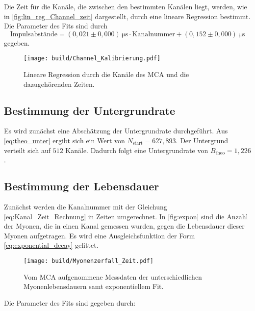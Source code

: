 Die Zeit für die Kanäle, die zwischen den bestimmten Kanälen liegt, werden, wie in \autoref{fig:lin_reg_Channel_zeit} dargestellt, durch eine lineare Regression bestimmt.
Die Parameter des Fits sind durch 
\begin{equation}
    \text{Impulsabstände} = \left(0,021 \pm 0,000 \right) \,\unit{\micro\second} \cdot  \text{Kanalnummer} + \left(0,152 \pm 0,000 \right) \,\unit{\micro\second}
    \label{eq:Kanal_Zeit_Rechnung}
\end{equation}
gegeben.

\begin{figure}[H]
    \centering
    \texttt{[image: build/Channel\_Kalibrierung.pdf]}
    \caption{Lineare Regression durch die Kanäle des MCA und die dazugehörenden Zeiten.}
    \label{fig:lin_reg_Channel_zeit}
\end{figure}

\subsection{Bestimmung der Untergrundrate}
\label{sec:Bes_Unt}
Es wird zunächst eine Abschätzung der Untergrundrate durchgeführt. Aus \eqref{eq:theo_unter} ergibt sich ein Wert von $N_\text{start} = 627,893$.
Der Untergrund verteilt sich auf $512$ Kanäle. Dadurch folgt eine Untergrundrate von $B_\text{theo} = 1,226$. %


\subsection{Bestimmung der Lebensdauer}
\label{sec:Bes_Leb}

Zunächst werden die Kanalnummer mit der Gleichung \eqref{eq:Kanal_Zeit_Rechnung} in Zeiten umgerechnet.
In \autoref{fig:expon} sind die Anzahl der Myonen, die in einen Kanal gemessen wurden, gegen die Lebensdauer dieser Myonen aufgetragen.
Es wird eine Ausgleichsfunktion der Form \eqref{eq:exponential_decay} gefittet.

\begin{figure}[H]
    \centering
    \texttt{[image: build/Myonenzerfall\_Zeit.pdf]}
    \caption{Vom MCA aufgenommene Messdaten der unterschiedlichen Myonenlebensdauern samt exponentiellem Fit.}
    \label{fig:expon}
\end{figure}

Die Parameter des Fits sind gegeben durch:

